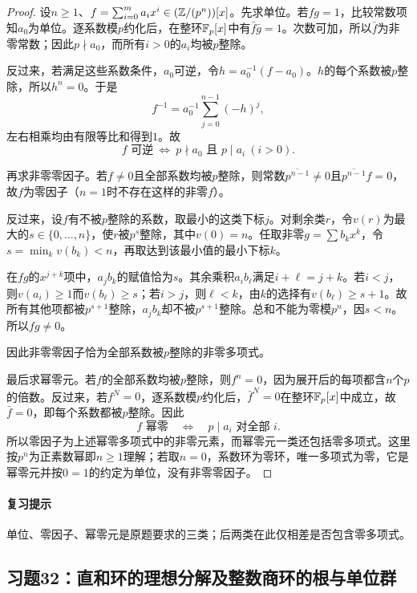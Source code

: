 \begin{proof}

设$n\ge1$、$f=\sum_{i=0}^m a_ix^i\in(\mathbb Z/(p^n))[x]$。先求单位。若$fg=1$，比较常数项知$a_0$为单位。逐系数模$p$约化后，在整环$\mathbb F_p[x]$中有$\bar f\bar g=1$。次数可加，所以$\bar f$为非零常数；因此$p\nmid a_0$，而所有$i>0$的$a_i$均被$p$整除。

反过来，若满足这些系数条件，$a_0$可逆，令$h=a_0^{-1}(f-a_0)$。$h$的每个系数被$p$整除，所以$h^n=0$。于是
\[
f^{-1}=a_0^{-1}\sum_{j=0}^{n-1}(-h)^j,
\]
左右相乘均由有限等比和得到$1$。故
\[
f\text{ 可逆}\ \Longleftrightarrow\ p\nmid a_0\text{ 且 }p\mid a_i\ (i>0).
\]

再求非零零因子。若$f\ne0$且全部系数均被$p$整除，则常数$\overline{p^{n-1}}\ne0$且$\overline{p^{n-1}}f=0$，故$f$为零因子（$n=1$时不存在这样的非零$f$）。

反过来，设$f$有不被$p$整除的系数，取最小的这类下标$j$。对剩余类$r$，令$v(r)$为最大的$s\in\{0,\ldots,n\}$，使$r$被$p^s$整除，其中$v(0)=n$。任取非零$g=\sum b_kx^k$，令$s=\min_kv(b_k)<n$，再取达到该最小值的最小下标$k$。

在$fg$的$x^{j+k}$项中，$a_jb_k$的赋值恰为$s$。其余乘积$a_ib_\ell$满足$i+\ell=j+k$。若$i<j$，则$v(a_i)\ge1$而$v(b_\ell)\ge s$；若$i>j$，则$\ell<k$，由$k$的选择有$v(b_\ell)\ge s+1$。故所有其他项都被$p^{s+1}$整除，$a_jb_k$却不被$p^{s+1}$整除。总和不能为零模$p^n$，因$s<n$。所以$fg\ne0$。

因此非零零因子恰为全部系数被$p$整除的非零多项式。


最后求幂零元。若$f$的全部系数均被$p$整除，则$f^n=0$，因为展开后的每项都含$n$个$p$的倍数。反过来，若$f^N=0$，逐系数模$p$约化后，$\bar f^N=0$在整环$\mathbb F_p[x]$中成立，故$\bar f=0$，即每个系数都被$p$整除。因此
\[
f\text{ 幂零}\quad\Longleftrightarrow\quad p\mid a_i\text{ 对全部 }i.
\]
所以零因子为上述幂零多项式中的非零元素，而幂零元一类还包括零多项式。这里按$p^n$为正素数幂即$n\ge1$理解；若取$n=0$，系数环为零环，唯一多项式为零，它是幂零元并按$0=1$的约定为单位，没有非零零因子。

\end{proof}

\paragraph{复习提示}

单位、零因子、幂零元是原题要求的三类；后两类在此仅相差是否包含零多项式。



\subsection{习题32：直和环的理想分解及整数商环的根与单位群}

